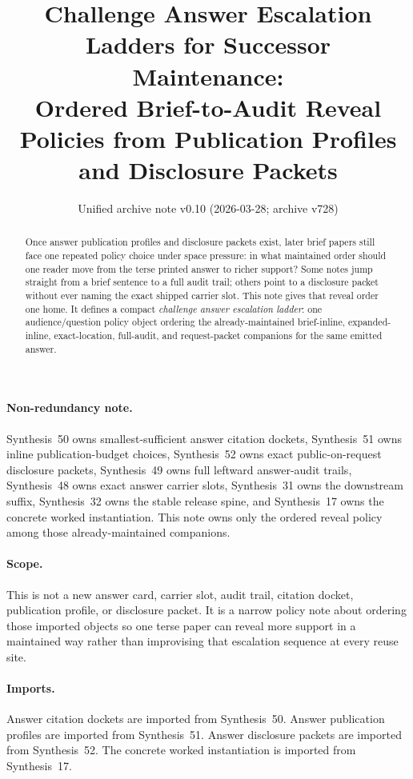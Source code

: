 \documentclass[11pt]{article}
\title{Challenge Answer Escalation Ladders for Successor Maintenance:\\[0.5ex]
\large Ordered Brief-to-Audit Reveal Policies from Publication Profiles and Disclosure Packets}
\author{}
\date{Unified archive note v0.10 (2026-03-28; archive v728)}
\begin{document}
\maketitle

\begin{abstract}
Once answer publication profiles and disclosure packets exist, later brief papers still face one repeated policy choice under space pressure: in what maintained order should one reader move from the terse printed answer to richer support? Some notes jump straight from a brief sentence to a full audit trail; others point to a disclosure packet without ever naming the exact shipped carrier slot. This note gives that reveal order one home. It defines a compact \emph{challenge answer escalation ladder}: one audience/question policy object ordering the already-maintained brief-inline, expanded-inline, exact-location, full-audit, and request-packet companions for the same emitted answer.
\end{abstract}

\paragraph{Non-redundancy note.}
Synthesis~50 owns smallest-sufficient answer citation dockets, Synthesis~51 owns inline publication-budget choices, Synthesis~52 owns exact public-on-request disclosure packets, Synthesis~49 owns full leftward answer-audit trails, Synthesis~48 owns exact answer carrier slots, Synthesis~31 owns the downstream suffix, Synthesis~32 owns the stable release spine, and Synthesis~17 owns the concrete worked instantiation.\cite{series:challengeanswercitationdockets,series:challengeanswerpublicationprofiles,series:challengeanswerdisclosurepackets,series:challengeansweraudittrails,series:challengeanswercarrierslots,series:downstreamnormalforms,series:releasespine,series:workedexample}
This note owns only the ordered reveal policy among those already-maintained companions.

\paragraph{Scope.}
This is not a new answer card, carrier slot, audit trail, citation docket, publication profile, or disclosure packet.
It is a narrow policy note about ordering those imported objects so one terse paper can reveal more support in a maintained way rather than improvising that escalation sequence at every reuse site.

\paragraph{Imports.}
Answer citation dockets are imported from Synthesis~50.\cite{series:challengeanswercitationdockets}
Answer publication profiles are imported from Synthesis~51.\cite{series:challengeanswerpublicationprofiles}
Answer disclosure packets are imported from Synthesis~52.\cite{series:challengeanswerdisclosurepackets}
The concrete worked instantiation is imported from Synthesis~17.\cite{series:workedexample}
\end{document}
